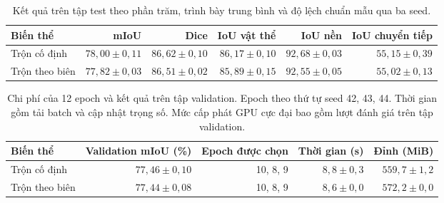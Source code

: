 \begin{table}[htbp]\centering\small
\begin{tabular}{@{}lrrrrr@{}}\toprule
Biến thể & mIoU & Dice & IoU vật thể & IoU nền & IoU chuyển tiếp\\\midrule
Trộn cố định & $78{,}00 \pm 0{,}11$ & $86{,}62 \pm 0{,}10$ & $86{,}17 \pm 0{,}10$ & $92{,}68 \pm 0{,}03$ & $55{,}15 \pm 0{,}39$\\
Trộn theo biên & $77{,}82 \pm 0{,}03$ & $86{,}51 \pm 0{,}02$ & $85{,}89 \pm 0{,}15$ & $92{,}55 \pm 0{,}05$ & $55{,}02 \pm 0{,}13$\\
\bottomrule\end{tabular}
\caption{Kết quả trên tập test theo phần trăm, trình bày trung bình và độ lệch chuẩn mẫu qua ba seed.}
\label{tab:results}\end{table}

\begin{table}[htbp]\centering\small
\begin{tabular}{@{}lrrrr@{}}\toprule
Biến thể & Validation mIoU (\%) & Epoch được chọn & Thời gian (s) & Đỉnh (MiB)\\\midrule
Trộn cố định & $77{,}46 \pm 0{,}10$ & 10, 8, 9 & $8{,}8 \pm 0{,}3$ & $559{,}7 \pm 1{,}2$\\
Trộn theo biên & $77{,}44 \pm 0{,}08$ & 10, 8, 9 & $8{,}6 \pm 0{,}0$ & $572{,}2 \pm 0{,}0$\\
\bottomrule\end{tabular}
\caption{Chi phí của 12 epoch và kết quả trên tập validation. Epoch theo thứ tự seed 42, 43, 44. Thời gian gồm tải batch và cập nhật trọng số. Mức cấp phát GPU cực đại bao gồm lượt đánh giá trên tập validation.}
\label{tab:cost}\end{table}
